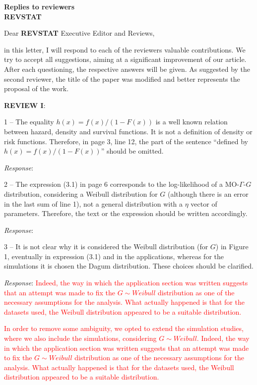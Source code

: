 \documentclass[version=last,12pt,{"maintainersDelight"},letterpaper,]{scrlttr2}
\begin{document}
\begin{letter}{\textbf{Replies to reviewers}\\\textbf{REVSTAT}\\}
\opening{Dear \textbf{REVSTAT} Executive Editor and Reviews,}

in this letter, I will respond to each of the reviewers valuable
contributions. We try to accept all suggestions, aiming at a significant
improvement of our article. After each questioning, the respective
answers will be given. As suggested by the second reviewer, the title of
the paper was modified and better represents the proposal of the work.

\textbf{REVIEW I}:

1 -- The equality \(h(x)=f(x)/(1-F(x))\) is a well known relation
between hazard, density and survival functions. It is not a definition
of density or risk functions. Therefore, in page 3, line 12, the part of
the sentence ``defined by \(h(x)=f(x)/(1-F(x))\)'' should be omitted.

\emph{Response}:

2 -- The expression (3.1) in page 6 corresponds to the log-likelihood of
a MO-\(\Gamma\)-\(G\) distribution, considering a Weibull distribution
for \(G\) (although there is an error in the last sum of line 1), not a
general distribution with a \(\eta\) vector of parameters. Therefore,
the text or the expression should be written accordingly.

\emph{Response}:

3 -- It is not clear why it is considered the Weibull distribution (for
\(G\)) in Figure 1, eventually in expression (3.1) and in the
applications, whereas for the simulations it is chosen the Dagum
distribution. These choices should be clarified.

\emph{Response}:
\textcolor{red}{Indeed, the way in which the application section was written suggests that an attempt was made to fix the $G\sim Weibull$ distribution as one of the necessary assumptions for the analysis. What actually happened is that for the datasets used, the Weibull distribution appeared to be a suitable distribution.}

\textcolor{red}{In order to remove some ambiguity, we opted to extend the simulation studies, where we also include the simulations, considering $G\sim Weibull$.
Indeed, the way in which the application section was written suggests that an attempt was made to fix the $G\sim Weibull$ distribution as one of the necessary assumptions for the analysis. What actually happened is that for the datasets used, the Weibull distribution appeared to be a suitable distribution.}


\end{letter}
\end{document}
